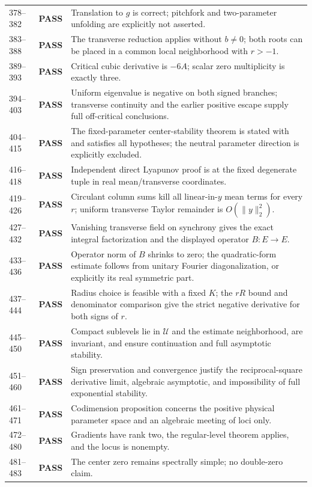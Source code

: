 \documentclass[11pt]{article}
\newcommand{\U}{\mathcal U}
\newcommand{\norm}[1]{\lVert#1\rVert}
\newcommand{\pass}{\textbf{PASS}}
\begin{document}
\begin{longtable}{@{}p{}p{}p{}@{}}
378--382 & \pass & Translation to $g$ is correct; pitchfork and two-parameter unfolding are explicitly not asserted.\\
383--388 & \pass & The transverse reduction applies without $b\ne0$; both roots can be placed in a common local neighborhood with $r>-1$.\\
389--393 & \pass & Critical cubic derivative is $-6A$; scalar zero multiplicity is exactly three.\\
394--403 & \pass & Uniform eigenvalue is negative on both signed branches; transverse continuity and the earlier positive escape supply full off-critical conclusions.\\
404--415 & \pass & The fixed-parameter center-stability theorem is stated with and satisfies all hypotheses; the neutral parameter direction is explicitly excluded.\\
416--418 & \pass & Independent direct Lyapunov proof is at the fixed degenerate tuple in real mean/transverse coordinates.\\
419--426 & \pass & Circulant column sums kill all linear-in-$y$ mean terms for every $r$; uniform transverse Taylor remainder is $O(\norm y_2^2)$.\\
427--432 & \pass & Vanishing transverse field on synchrony gives the exact integral factorization and the displayed operator $B:E\to E$.\\
433--436 & \pass & Operator norm of $B$ shrinks to zero; the quadratic-form estimate follows from unitary Fourier diagonalization, or explicitly its real symmetric part.\\
437--444 & \pass & Radius choice is feasible with a fixed $K$; the $rR$ bound and denominator comparison give the strict negative derivative for both signs of $r$.\\
445--450 & \pass & Compact sublevels lie in $\U$ and the estimate neighborhood, are invariant, and ensure continuation and full asymptotic stability.\\
451--460 & \pass & Sign preservation and convergence justify the reciprocal-square derivative limit, algebraic asymptotic, and impossibility of full exponential stability.\\
461--471 & \pass & Codimension proposition concerns the positive physical parameter space and an algebraic meeting of loci only.\\
472--480 & \pass & Gradients have rank two, the regular-level theorem applies, and the locus is nonempty.\\
481--483 & \pass & The center zero remains spectrally simple; no double-zero claim.\\

\end{longtable}
\end{document}
